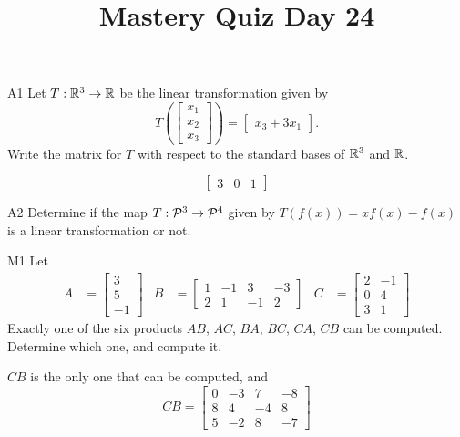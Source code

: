 \documentclass{sbgLAquiz}
\title{Mastery Quiz Day 24 }
\begin{document}
\begin{problem}{A1}
Let $T: \IR^3 \rightarrow \IR$ be the linear transformation given by $$T\left(\begin{bmatrix} x_1 \\ x_2 \\ x_3  \end{bmatrix} \right) = \begin{bmatrix} x_3+3x_1 \end{bmatrix}.$$ Write the matrix for $T$ with respect to the standard bases of $\IR^3$ and $\IR$.
\end{problem}
\begin{solution}
$$\begin{bmatrix} 3 & 0 & 1 \end{bmatrix}$$
\end{solution}
\begin{problem}{A2}
Determine if the map $T: \P^3 \rightarrow \P^4$ given by $T(f(x))=xf(x)-f(x)$ is a linear transformation or not.
\end{problem}
\begin{extract}\newpage\end{extract}
\begin{problem}{M1}
Let 
\begin{align*}
A &= \begin{bmatrix} 3 \\ 5 \\ -1  \end{bmatrix} & B&=\begin{bmatrix} 1 & -1 & 3 & -3 \\ 2 & 1 & -1 & 2 \end{bmatrix} & C &= \begin{bmatrix} 2 & -1 \\ 0 & 4 \\ 3 & 1 \end{bmatrix} \end{align*}
Exactly one of the six products $AB$, $AC$, $BA$, $BC$, $CA$, $CB$ can be computed.  Determine which one, and compute it.
\end{problem}
\begin{solution}
$CB$ is the only one that can be computed, and
$$CB=\begin{bmatrix} 0 & -3 & 7 & -8 \\ 8 & 4 & -4 & 8 \\ 5 & -2 & 8 & -7 \end{bmatrix}$$
\end{solution}
\end{document}
